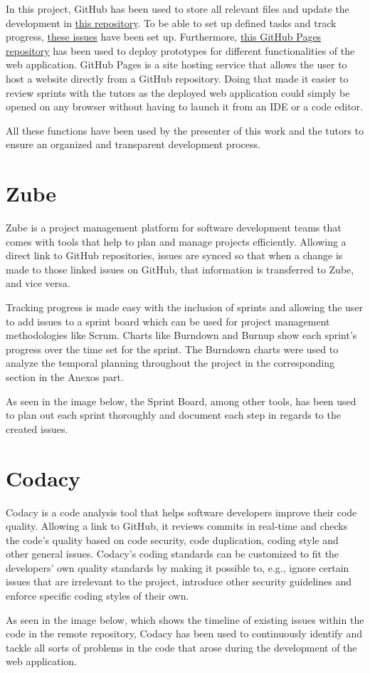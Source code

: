 In this project, GitHub has been used to store all relevant files and update the development in \href{https://github.com/danieldf01/TFG-decision-trees-sim/}{this repository}. To be able to set up defined tasks and track progress, \href{https://github.com/danieldf01/TFG-decision-trees-sim/issues}{these issues} have been set up. Furthermore, \href{https://danieldf01.github.io/}{this GitHub Pages repository} has been used to deploy prototypes for different functionalities of the web application. GitHub Pages is a site hosting service that allows the user to host a website directly from a GitHub repository. Doing that made it easier to review sprints with the tutors as the deployed web application could simply be opened on any browser without having to launch it from an IDE or a code editor.

All these functions have been used by the presenter of this work and the tutors to ensure an organized and transparent development process.

\section{Zube}
Zube is a project management platform for software development teams that comes with tools that help to plan and manage projects efficiently. Allowing a direct link to GitHub repositories, issues are synced so that when a change is made to those linked issues on GitHub, that information is transferred to Zube, and vice versa.

Tracking progress is made easy with the inclusion of sprints and allowing the user to add issues to a sprint board which can be used for project management methodologies like Scrum. Charts like Burndown and Burnup show each sprint's progress over the time set for the sprint. The Burndown charts were used to analyze the temporal planning throughout the project in the corresponding section in the Anexos part.

As seen in the image below, the Sprint Board, among other tools, has been used to plan out each sprint thoroughly and document each step in regards to the created issues.

\section{Codacy}
Codacy is a code analysis tool that helps software developers improve their code quality. Allowing a link to GitHub, it reviews commits in real-time and checks the code's quality based on code security, code duplication, coding style and other general issues.
Codacy's coding standards can be customized to fit the developers' own quality standards by making it possible to, e.g., ignore certain issues that are irrelevant to the project, introduce other security guidelines and enforce specific coding styles of their own.

As seen in the image below, which shows the timeline of existing issues within the code in the remote repository, Codacy has been used to continuously identify and tackle all sorts of problems in the code that arose during the development of the web application.
